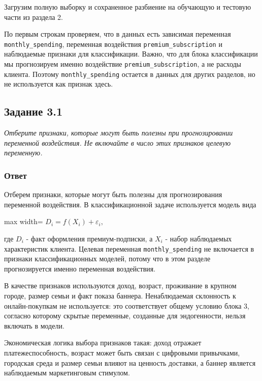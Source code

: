 \documentclass[11pt]{article}
\newenvironment{tasktext}
      {\begin{tcolorbox}[breakable, colback=black!3, colframe=black!28,
        boxrule=0.4pt, arc=1.5mm, left=7pt, right=7pt, top=5pt, bottom=5pt,
        before skip=0.35em, after skip=0.75em]\itshape}
      {\end{tcolorbox}}
\begin{document}
    Загрузим полную выборку и сохраненное разбиение на обучающую и тестовую
части из раздела 2.

    По первым строкам проверяем, что в данных есть зависимая переменная
\texttt{monthly\_spending}, переменная воздействия
\texttt{premium\_subscription} и наблюдаемые признаки для классификации.
Важно, что для блока классификации мы прогнозируем именно воздействие
\texttt{premium\_subscription}, а не расходы клиента. Поэтому
\texttt{monthly\_spending} остается в данных для других разделов, но не
используется как признак здесь.

    \subsection{Задание 3.1}\label{ux437ux430ux434ux430ux43dux438ux435-3.1}

\begin{tasktext}
Отберите признаки, которые могут быть полезны при прогнозировании
переменной воздействия. Не включайте в число этих признаков целевую
переменную.
\end{tasktext}

\subsubsection{Ответ}

Отберем признаки, которые могут быть полезны для прогнозирования
переменной воздействия. В классификационной задаче используется модель
вида

\begin{center}
\begin{adjustbox}{max width=\linewidth}
\(\displaystyle D_i = f(X_i) + \varepsilon_i,\)
\end{adjustbox}
\end{center}

где \(D_i\) - факт оформления премиум-подписки, а \(X_i\) - набор
наблюдаемых характеристик клиента. Целевая переменная
\texttt{monthly\_spending} не включается в признаки классификационных
моделей, потому что в этом разделе прогнозируется именно переменная
воздействия.

    В качестве признаков используются доход, возраст, проживание в крупном
городе, размер семьи и факт показа баннера. Ненаблюдаемая склонность к
онлайн-покупкам не используется: это соответствует общему условию блока
3, согласно которому скрытые переменные, созданные для эндогенности,
нельзя включать в модели.

Экономическая логика выбора признаков такая: доход отражает
платежеспособность, возраст может быть связан с цифровыми привычками,
городская среда и размер семьи влияют на ценность доставки, а баннер
является наблюдаемым маркетинговым стимулом.
\end{document}
